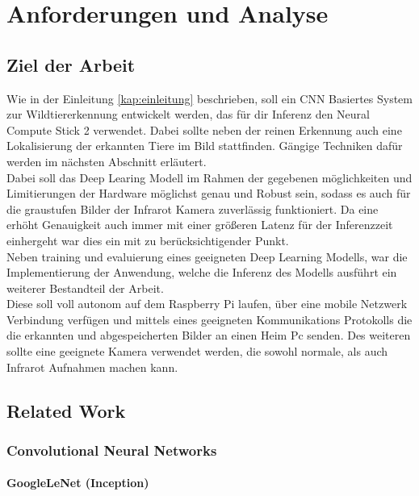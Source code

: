 \chapter{Anforderungen und Analyse}\label{kap:anforderunganalyse}

\section{Ziel der Arbeit}\label{sec:zielderarbeit}


Wie in der Einleitung \ref{kap:einleitung} beschrieben, soll 
ein CNN Basiertes System zur Wildtiererkennung entwickelt 
werden, das für dir Inferenz den Neural Compute Stick 2 verwendet.
Dabei sollte neben der reinen Erkennung auch eine Lokalisierung 
der erkannten Tiere im Bild stattfinden. Gängige Techniken dafür 
werden im nächsten Abschnitt erläutert.
\\
Dabei soll das Deep Learing Modell im Rahmen der gegebenen 
möglichkeiten und Limitierungen der Hardware möglichst 
genau und Robust sein, sodass es auch für die graustufen 
Bilder der Infrarot Kamera zuverlässig funktioniert.
Da eine erhöht Genauigkeit auch immer mit einer größeren
Latenz für der Inferenzzeit einhergeht war dies ein mit 
zu berücksichtigender Punkt.
\\
Neben training und evaluierung eines geeigneten Deep Learning Modells,
war die Implementierung der Anwendung, welche die Inferenz 
des Modells ausführt ein weiterer Bestandteil der Arbeit.
\\
Diese soll voll autonom auf dem Raspberry Pi laufen,
über eine mobile Netzwerk Verbindung verfügen und 
mittels eines geeigneten Kommunikations Protokolls die 
die erkannten und abgespeicherten Bilder an einen
Heim Pc senden.
Des weiteren sollte eine geeignete Kamera verwendet werden, die 
sowohl normale, als auch Infrarot Aufnahmen machen kann.


\section{Related Work}\label{sec:related_work}

\subsection{Convolutional Neural Networks}

\subsubsection{GoogleLeNet (Inception)}

